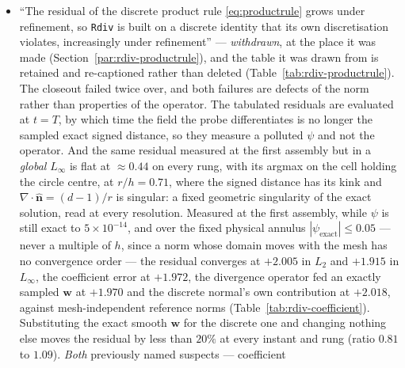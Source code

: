 \documentclass[preprint,3p,11pt]{elsarticle}
\newcommand{\psilev}{\psi}
\newcommand{\nhat}{\hat{\mathbf{n}}}
\begin{document}
\begin{itemize}
    surface-tension force, no curvature and no feedback of any kind: band
    gradient order $-3.800$, shape $-1.306$, volume $-1.544$, with every run
    completing (Table~\ref{tab:rdiv-kinematic}). Its coupled behaviour is a
    property of the discrete operator \eqref{eq:rdivassembly}, and needs no
    appeal to the loop. The corrected reading, and the reason the divergence form
    had never been run kinematically at all --- \texttt{fvm::div(phiW,psi)}
    aborted at the first step for want of a scheme entry --- are recorded in
    Section~\ref{sec:rdiv}.
  \item ``The residual of the discrete product rule \eqref{eq:productrule} grows
    under refinement, so \texttt{Rdiv} is built on a discrete identity that its own
    discretisation violates, increasingly under refinement'' --- \emph{withdrawn},
    at the place it was made (Section~\ref{par:rdiv-productrule}), and the table it
    was drawn from is retained and re-captioned rather than deleted
    (Table~\ref{tab:rdiv-productrule}). The closeout failed twice over, and both
    failures are defects of the norm rather than properties of the operator. The
    tabulated residuals are evaluated at $t=T$, by which time the field the probe
    differentiates is no longer the sampled exact signed distance, so they measure a
    polluted $\psilev$ and not the operator. And the same residual measured at the
    first assembly but in a \emph{global} $L_\infty$ is flat at $\approx0.44$ on
    every rung, with its argmax on the cell holding the circle centre, at
    $r/h = 0.71$, where the signed distance has its kink and
    $\nabla\cdot\nhat = (d-1)/r$ is singular: a fixed geometric singularity of the
    exact solution, read at every resolution. Measured at the first assembly, while
    $\psilev$ is still exact to $5\times10^{-14}$, and over the fixed physical
    annulus $|\psilev_{\text{exact}}| \le 0.05$ --- never a multiple of $h$, since a
    norm whose domain moves with the mesh has no convergence order --- the residual
    converges at $+2.005$ in $L_2$ and $+1.915$ in $L_\infty$, the coefficient error
    at $+1.972$, the divergence operator fed an exactly sampled $\mathbf{w}$ at
    $+1.970$ and the discrete normal's own contribution at $+2.018$, against
    mesh-independent reference norms (Table~\ref{tab:rdiv-coefficient}).
    Substituting the exact smooth $\mathbf{w}$ for the discrete one and changing
    nothing else moves the residual by less than $20\%$ at every instant and rung
    (ratio $0.81$ to $1.09$). \emph{Both} previously named suspects --- coefficient

\end{itemize}
\end{document}
